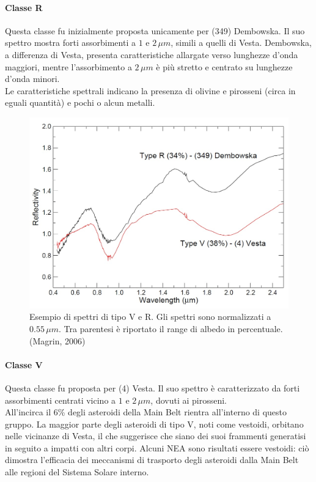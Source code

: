 \documentclass[a4paper,11pt,openright]{book}
\begin{document}
\paragraph*{Classe R}
Questa classe fu inizialmente proposta unicamente per (349) Dembowska. Il suo spettro mostra forti assorbimenti a $1$ e $2\,\mu m$, simili a quelli di Vesta. Dembowska, a differenza di Vesta, presenta caratteristiche allargate verso lunghezze d'onda maggiori, mentre l'assorbimento a $2\,\mu m$ è più stretto e centrato su lunghezze d'onda minori.\\
Le caratteristiche spettrali indicano la presenza di olivine e pirosseni (circa in eguali quantità) e pochi o alcun metalli. 

\begin{figure}
    \centering
    \includegraphics[scale=0.3]{figure/spettro_rv.jpg}
    \caption{Esempio di spettri di tipo V e R. Gli spettri sono normalizzati a $0.55\,\mu m$. Tra parentesi è riportato il range di albedo in percentuale. (Magrin, 2006)}
    \label{spettro_rv}
\end{figure}

\paragraph*{Classe V}
Questa classe fu proposta per (4) Vesta. Il suo spettro è caratterizzato da forti assorbimenti centrati vicino a $1$ e $2\,\mu m$, dovuti ai pirosseni.\\
All'incirca il 6\% degli asteroidi della Main Belt rientra all'interno di questo gruppo. La maggior parte degli asteroidi di tipo V, noti come vestoidi, orbitano nelle vicinanze di Vesta, il che suggerisce che siano dei suoi frammenti generatisi in seguito a impatti con altri corpi. Alcuni NEA sono risultati essere vestoidi: ciò dimostra l'efficacia dei meccanismi di trasporto degli asteroidi dalla Main Belt alle regioni del Sistema Solare interno.
\end{document}
